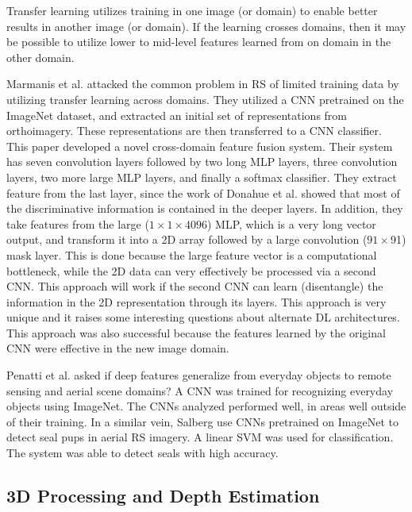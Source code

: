 \documentclass[12pt]{spieman}
\begin{document}
\begin{spacing}{1}
Transfer learning utilizes training in one image (or domain) to enable better results in another image (or domain). If the learning crosses domains, then it may be possible to utilize lower to mid-level features learned from on domain in the other domain. 

Marmanis et al. \cite{marmanis2016deep} attacked the common problem in RS of limited training data by utilizing transfer learning across domains. They utilized a CNN pretrained on the ImageNet dataset, and extracted an initial set of representations from orthoimagery. These representations are then transferred to a CNN classifier. This paper developed a novel cross-domain feature fusion system. Their system has seven convolution layers followed by two long MLP layers, three convolution layers, two more large MLP layers, and finally a softmax classifier. They extract feature from the last layer, since the work of Donahue et al. \cite{Donahue2014DeCAF} showed that most of the discriminative information is contained in the deeper layers. In addition, they take features from the large ($1 \times 1 \times 4096$) MLP, which is a very long vector output, and transform it into a 2D array followed by a large convolution ($91 \times $91) mask layer. This is done because the large feature vector is a computational bottleneck, while the 2D data can very effectively be processed via a second CNN. This approach will work if the second CNN can learn (disentangle) the information in the 2D representation through its layers. This approach is very unique and it raises some interesting questions about alternate DL architectures. This approach was also successful because the features learned by the original CNN were effective in the new image domain. 

Penatti et al. \cite{Penatti2015Deep} asked if deep features generalize from everyday objects to remote sensing and aerial scene domains? A CNN was trained for recognizing everyday objects using ImageNet. The CNNs analyzed performed well, in areas well outside of their training. In a similar vein, Salberg \cite{Salberg2015} use CNNs pretrained on ImageNet to detect seal pups in aerial RS imagery. A linear SVM was used for classification. The system was able to detect seals with high accuracy.

\subsection{3D Processing and Depth Estimation}


\end{spacing}
\end{document}
